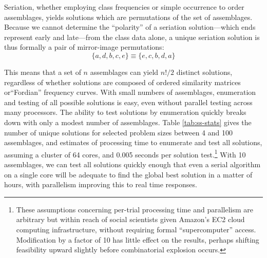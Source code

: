 \documentclass[preprint,times,authoryear,12pt]{els-workingpaper}
\begin{document}
Seriation, whether employing class frequencies or simple occurrence to order assemblages, yields solutions which are permutations of the set of assemblages.  Because we cannot determine the ``polarity'' of a seriation solution---which ends represent early and late---from the class data alone, a unique seriation solution is thus formally a pair of mirror-image permutations:
\begin{equation}
\{a,d,b,c,e\} \equiv \{e,c,b,d,a\}
\end{equation}

This means that a set of $n$ assemblages can yield $n! / 2$ distinct solutions, regardless of whether solutions are composed of ordered similarity matrices or``Fordian'' frequency curves.  With small numbers of assemblages, enumeration and testing of all possible solutions is easy, even without parallel testing across many processors.  The ability to test solutions by enumeration quickly breaks down with only a modest number of assemblages.  Table \ref{tab:ss-stats} gives the number of unique solutions for selected problem sizes between 4 and 100 assemblages, and estimates of processing time to enumerate and test all solutions, assuming a cluster of 64 cores, and 0.005 seconds per solution test.\footnote{These assumptions concerning per-trial processing time and parallelism are arbitrary but within reach of social scientists given Amazon's EC2 cloud computing infrastructure, without requiring formal ``supercomputer'' access.  Modification by a factor of 10 has little effect on the results, perhaps shifting feasibility upward slightly before combinatorial explosion occurs.}  With 10 assemblages, we can test all solutions quickly enough that even a serial algorithm on a single core will be adequate to find the global best solution in a matter of hours, with parallelism improving this to real time responses.  
\end{document}
